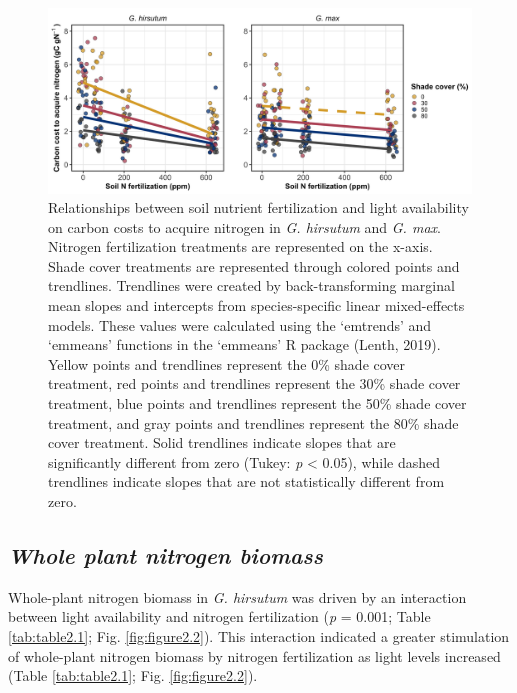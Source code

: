 \clearpage

\newpage
\begin{landscape}
\begin{figure}
    \includegraphics[scale = 0.061]{ch2_LxN_Greenhouse/figs/fig1_ncost.png}
    \centering
    \caption[Relationships between soil nitrogen fertilization and light availability on carbon costs to acquire nitrogen in \textit{G. hirsutum} and \textit{G. max}]{Relationships between soil nutrient fertilization and light availability on carbon costs to acquire nitrogen in \textit{G. hirsutum} and \textit{G. max}. Nitrogen fertilization treatments are represented on the x-axis. Shade cover treatments are represented through colored points and trendlines. Trendlines were created by back-transforming marginal mean slopes and intercepts from species-specific linear mixed-effects models. These values were calculated using the ‘emtrends’ and ‘emmeans’ functions in the ‘emmeans’ R package (Lenth, 2019). Yellow points and trendlines represent the 0\% shade cover treatment, red points and trendlines represent the 30\% shade cover treatment, blue points and trendlines represent the 50\% shade cover treatment, and gray points and trendlines represent the 80\% shade cover treatment. Solid trendlines indicate slopes that are significantly different from zero (Tukey: \textit{p} < 0.05), while dashed trendlines indicate slopes that are not statistically different from zero.}
    \label{fig:figure2.1}
\end{figure}
\end{landscape}
\clearpage


\newpage
\subsection{\textit{Whole plant nitrogen biomass}}
Whole-plant nitrogen biomass in \textit{G. hirsutum} was driven by an interaction between light availability and nitrogen fertilization (\textit{p} = 0.001; Table \ref{tab:table2.1}; Fig. \ref{fig:figure2.2}). This interaction indicated a greater stimulation of whole-plant nitrogen biomass by nitrogen fertilization as light levels increased (Table \ref{tab:table2.1}; Fig. \ref{fig:figure2.2}).

